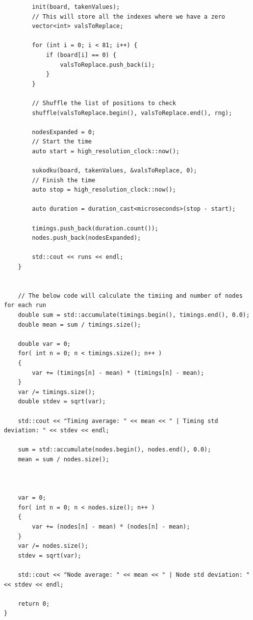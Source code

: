 \documentclass{article}
\begin{document}
\begin{titlepage}
\begin{lstlisting}
        init(board, takenValues);
        // This will store all the indexes where we have a zero
        vector<int> valsToReplace;

        for (int i = 0; i < 81; i++) {
            if (board[i] == 0) {
                valsToReplace.push_back(i);
            }
        }

        // Shuffle the list of positions to check
        shuffle(valsToReplace.begin(), valsToReplace.end(), rng);

        nodesExpanded = 0;
        // Start the time
        auto start = high_resolution_clock::now();

        sukodku(board, takenValues, &valsToReplace, 0);
        // Finish the time
        auto stop = high_resolution_clock::now();

        auto duration = duration_cast<microseconds>(stop - start);

        timings.push_back(duration.count());
        nodes.push_back(nodesExpanded);

        std::cout << runs << endl;
    }


    // The below code will calculate the timiing and number of nodes for each run
    double sum = std::accumulate(timings.begin(), timings.end(), 0.0);
    double mean = sum / timings.size();

    double var = 0;
    for( int n = 0; n < timings.size(); n++ )
    {
        var += (timings[n] - mean) * (timings[n] - mean);
    }
    var /= timings.size();
    double stdev = sqrt(var);

    std::cout << "Timing average: " << mean << " | Timing std deviation: " << stdev << endl;

    sum = std::accumulate(nodes.begin(), nodes.end(), 0.0);
    mean = sum / nodes.size();



    var = 0;
    for( int n = 0; n < nodes.size(); n++ )
    {
        var += (nodes[n] - mean) * (nodes[n] - mean);
    }
    var /= nodes.size();
    stdev = sqrt(var);

    std::cout << "Node average: " << mean << " | Node std deviation: " << stdev << endl;

    return 0;
}

\end{lstlisting}
\end{titlepage}
\end{document}
